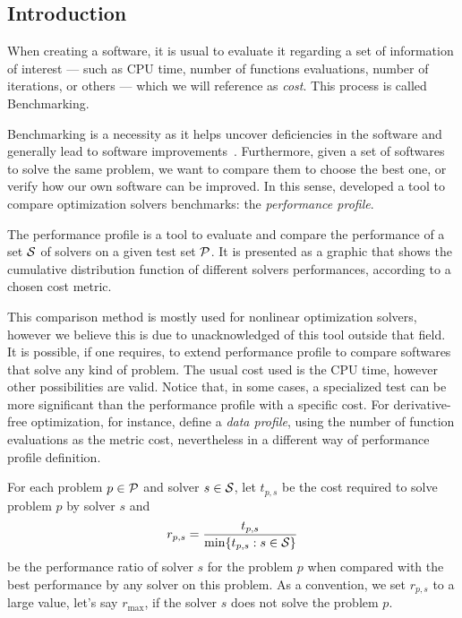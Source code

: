\subsection*{Introduction}

    When creating a software, it is usual to evaluate it regarding a set of
    information of interest
    --- such as CPU time, number of
    functions evaluations, number of iterations, or others --- which we will
    reference as \emph{cost}. This process is called Benchmarking.

    Benchmarking is a necessity as it
    helps uncover deficiencies in the software and generally lead
    to software
    improvements~\cite{url:mittelmann,Mittelmann:1999fb,Dolan:2006kl}.
    Furthermore, given a set of softwares to solve the same problem, we want to
    compare them to choose the best one, or verify how our own software can be
    improved.
    In this sense, \textcite{Dolan:2002du} developed a tool to compare
    optimization solvers benchmarks: the \emph{performance profile}.

    The performance profile is a tool to evaluate and compare the performance
    of a set $\mathcal{S}$ of solvers  on a given test set $\mathcal{P}$. It is presented as
    a graphic that shows the cumulative distribution function of different 
    solvers performances, according to a chosen cost metric.

    This comparison method is mostly used for nonlinear optimization solvers, 
    however we believe this is due to unacknowledged of this tool outside that
    field.
    It is possible, if one requires, to extend performance profile to compare  
    softwares that solve any kind of problem.  The usual cost used is the CPU 
    time, however other possibilities are valid.  Notice that, in some cases, a
    specialized test can be more significant than the performance profile with
    a specific cost.  For derivative-free optimization, for instance,
    \textcite{More:2009benchmarking} define a \emph{data profile}, using the
    number of function evaluations as the metric cost, nevertheless in a 
    different way of performance profile definition.

    For each
    problem $p \in \mathcal{P}$ and solver $s \in \mathcal{S}$, let $t_{p,s}$ be the
    cost required to solve problem $p$ by solver $s$ and
    \begin{align*}
      r_{p,s} = \frac{t_{p,s}}{\min\{t_{p,s}: s \in \mathcal{S}\}}
    \end{align*}
    be the performance ratio of solver $s$ for the problem $p$ when compared
    with the best performance by any solver on this problem.
    As a convention, we set $r_{p,s}$ to a large value, let's say $r_{\max}$, if
    the solver $s$ does not solve the problem $p$.

